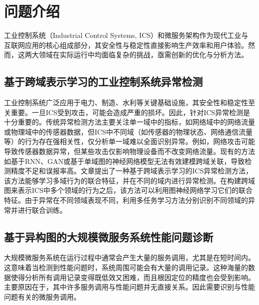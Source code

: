 \section{问题介绍}

工业控制系统（Industrial Control Systems, ICS）和微服务架构作为现代工业与互联网应用的核心组成部分，其安全性与稳定性直接影响生产效率和用户体验。然而，这两大领域在实际运行中均面临复杂的挑战，亟需创新的优化与分析方法。

\subsection{基于跨域表示学习的工业控制系统异常检测\cite{zhan2024anomaly}}

工业控制系统广泛应用于电力、制造、水利等关键基础设施，其安全性和稳定性至关重要。一旦ICS受到攻击，可能会造成严重的损坏。因此，针对ICS异常检测是十分重要的。传统异常检测方法主要关注单一域中的指标，如网络域中的网络流量或物理域中的传感器数据，但ICS中不同域（如传感器的物理状态、网络通信流量等）的行为存在强相关性，仅分析单一域难以全面识别异常。例如，网络攻击可能导致传感器数据异常，但某些攻击仅影响物理设备而不改变网络流量。现有的方法如基于RNN\cite{mandic2001recurrent}、GAN\cite{creswell2018generative}或基于单域图的神经网络模型无法有效建模跨域关联，导致检测精度不足和误报率高。文章提出了一种基于跨域表示学习的ICS异常检测方法，该方法能够学习多域行为的联合特征，并在不同的域内进行异常检测。在构建跨域图来表示ICS中多个领域的行为之后，该方法可以利用图神经网络学习它们的联合特征。由于异常在不同领域表现不同，利用多任务学习方法分别识别不同领域的异常并进行联合训练。

\subsection{基于异构图的大规模微服务系统性能问题诊断\cite{tao2024diagnosing}}

大规模微服务系统在运行过程中通常会产生大量的服务调用，尤其是在短时间内。这意味着当检测到性能问题时，系统周围可能会有大量的调用记录。这种海量的数据使得分析所有调用记录变得既低效又困难，而且根因定位的精度也会受到影响。主要原因在于，其中许多服务调用与性能问题并无直接关系。因此需要识别与性能问题有关的微服务调用。

